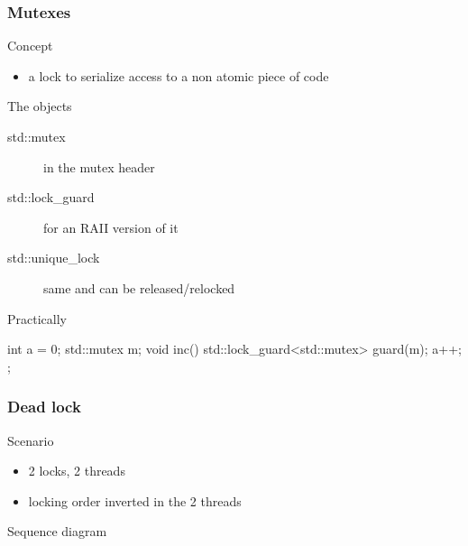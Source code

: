 \begin{frame}[fragile]
  \frametitle{Mutexes}
  \begin{block}{Concept}
    \begin{itemize}
    \item a lock to serialize access to a non atomic piece of code
    \end{itemize}
  \end{block}
  \pause
  \begin{block}{The objects}
    \begin{description}
    \item[std::mutex] in the mutex header
    \item[std::lock\_guard] for an RAII version of it
    \item[std::unique\_lock] same and can be released/relocked
    \end{description}
  \end{block}
  \pause
  \begin{exampleblock}{Practically}
    \begin{cppcode*}{}
      int a = 0;
      std::mutex m;
      void inc() {
        std::lock_guard<std::mutex> guard(m);
        a++;
      };
    \end{cppcode*}
  \end{exampleblock}
\end{frame}

\begin{frame}[fragile]
  \frametitle{Dead lock}
  \begin{exampleblock}{Scenario}
    \begin{itemize}
    \item 2 locks, 2 threads
    \item locking order inverted in the 2 threads
    \end{itemize}
  \end{exampleblock}
  \pause
  \begin{block}{Sequence diagram}
  \end{block}
\end{frame}

